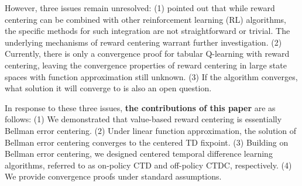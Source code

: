 However, three issues remain unresolved:
(1) \citet{naik2024reward,naik2024reinforcement}
 pointed out that while reward centering can be combined with 
 other reinforcement learning (RL) algorithms, 
 the specific methods for such integration are 
 not straightforward or trivial. 
 The underlying mechanisms of reward centering warrant further investigation.
(2) Currently, there is only a convergence proof for tabular
 Q-learning with reward centering, 
 leaving the convergence properties of reward centering
  in large state spaces with function approximation still unknown.
(3) If the algorithm converges, what solution it will converge to
 is also an open question.

 In response to these three issues, 
 \textbf{the contributions of this paper} are as follows:
(1) We demonstrated that value-based reward centering is essentially Bellman
error centering. 
(2) Under linear function approximation,  the solution of
Bellman error centering converges to
the centered TD fixpoint.
(3) Building on Bellman error centering, we designed centered temporal difference
learning algorithms, referred to as on-policy CTD and off-policy CTDC, respectively.
(4) We provide convergence proofs under standard assumptions.  



